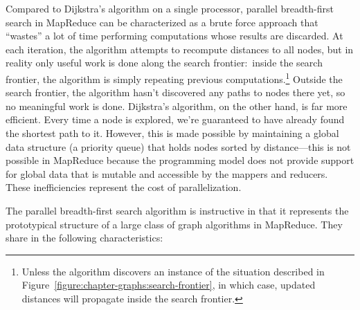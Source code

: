 Compared to Dijkstra's algorithm on a single processor, parallel
breadth-first search in MapReduce can be characterized as a brute
force approach that ``wastes'' a lot of time performing computations
whose results are discarded.  At each iteration, the algorithm
attempts to recompute distances to all nodes, but in reality only
useful work is done along the search frontier:\ inside the search
frontier, the algorithm is simply repeating previous
computations.\footnote{Unless the algorithm discovers an instance of
  the situation described in
  Figure~\ref{figure:chapter-graphs:search-frontier}, in which case,
  updated distances will propagate inside the search frontier.}
Outside the search frontier, the algorithm hasn't discovered any paths
to nodes there yet, so no meaningful work is done.  Dijkstra's
algorithm, on the other hand, is far more efficient.  Every time a
node is explored, we're guaranteed to have already found the shortest
path to it.  However, this is made possible by maintaining a global
data structure (a priority queue) that holds nodes sorted by
distance---this is not possible in MapReduce because the programming
model does not provide support for global data that is mutable and
accessible by the mappers and reducers.  These inefficiencies
represent the cost of parallelization.

The parallel breadth-first search algorithm is instructive in that it
represents the prototypical structure of a large class of graph
algorithms in MapReduce.  They share in the following characteristics:

